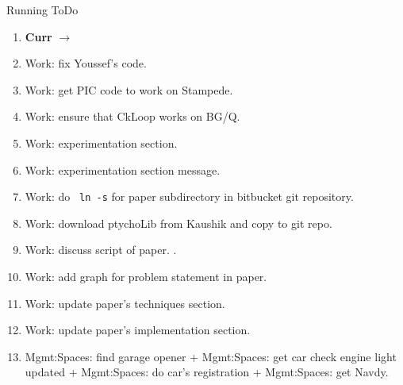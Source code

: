 \begin{columns}
\begin{column}{0.5\linewidth}
      \begin{block}{Running ToDo} %
        \begin{enumerate} 

          \item \tiny \textbf{Curr} $\rightarrow$
          \item \tiny Work: fix Youssef's code. 
          \item \tiny Work: get PIC code to work on Stampede. 
          \item \tiny Work: ensure that CkLoop works on BG/Q. 
          \item \tiny Work: experimentation section. 
          \item \tiny Work: experimentation section message.
          \item \tiny Work: do \texttt{ ln -s} for paper subdirectory in bitbucket git repository.
          \item \tiny Work: download ptychoLib from Kaushik and copy to git repo.            
          \item \tiny Work: discuss script of paper. 
             . 

          \item \tiny Work: add graph for problem statement in paper. 
          \item \tiny Work: update paper's techniques section. 
          \item \tiny Work: update paper's implementation section. 
          \item \tiny Mgmt:Spaces: find garage opener + Mgmt:Spaces:
            get car check engine light updated + Mgmt:Spaces: do car's
            registration + Mgmt:Spaces: get Navdy.


\end{enumerate}
\end{block}
\end{column}
\end{columns}
